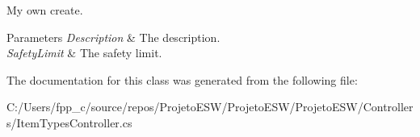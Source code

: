 My own create.


\begin{DoxyParams}{Parameters}
{\em Description} & The description.\\
\hline
{\em Safety\+Limit} & The safety limit.\\
\hline
\end{DoxyParams}


The documentation for this class was generated from the following file\+:\begin{DoxyCompactItemize}
\item 
C\+:/\+Users/fpp\+\_\+c/source/repos/\+Projeto\+E\+S\+W/\+Projeto\+E\+S\+W/\+Projeto\+E\+S\+W/\+Controllers/Item\+Types\+Controller.\+cs\end{DoxyCompactItemize}
